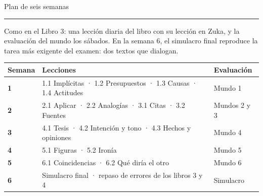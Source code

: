 \clearpage\renewcommand{\zuka@mundoactual}{Plan de estudio}
{\sffamily\fontsize{26}{30}\selectfont\firalight Plan de seis semanas\par}\vspace{2pt}
{\color{zlime}\rule{18mm}{1.6pt}}\par\vspace{6pt}
{\small Como en el Libro 3: una lección diaria del libro con su lección en Zuka, y la evaluación del mundo los sábados. En
la semana 6, el simulacro final reproduce la tarea más exigente del examen: dos textos que dialogan.\par}
\vspace{6pt}
\begin{center}\small
\begin{tabularx}{\linewidth}{@{}>{\sffamily\bfseries\color{zolive}}lX>{\raggedleft\arraybackslash}p{24mm}@{}}
\toprule
\textbf{Semana} & \textbf{Lecciones} & \textbf{Evaluación}\\\midrule
1 & 1.1 Implícitas · 1.2 Presupuestos · 1.3 Causas · 1.4 Actitudes & Mundo 1\\
2 & 2.1 Aplicar · 2.2 Analogías · 3.1 Citas · 3.2 Fuentes & Mundos 2 y 3\\
3 & 4.1 Tesis · 4.2 Intención y tono · 4.3 Hechos y opiniones & Mundo 4\\
4 & 5.1 Figuras · 5.2 Ironía & Mundo 5\\
5 & 6.1 Coincidencias · 6.2 Qué diría el otro & Mundo 6\\
6 & Simulacro final · repaso de errores de los libros 3 y 4 & Simulacro\\
\bottomrule
\end{tabularx}
\end{center}

